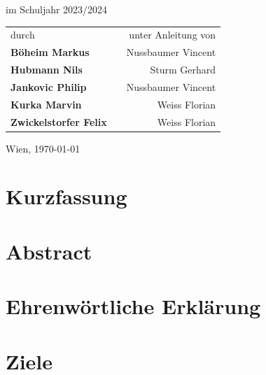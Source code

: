 \documentclass[
    headings=optiontotocandhead,%
    twoside,
    numbers=noenddot,%
    toc=flat, %
    12pt, %
    titlepage, %
    parskip=full, %
    listof=totoc, %
    listof=flat, %
    numbers=noenddot, %
    bibliography=totoc, %
    a4paper,DIV=14,
    BCOR=15mm,
]{scrbook}
\begin{document}
\begin{titlepage}
\begin{center}
 \vfill
 im Schuljahr 2023/2024\\

\vspace{1cm}

{
\renewcommand{\arraystretch}{1.8}
\begin{tabular}{l c r}
durch  & \hfill & unter Anleitung von \\
\textbf{\large{}Böheim Markus} && Nussbaumer Vincent \\
\textbf{\large{}Hubmann Nils} && Sturm Gerhard \\
\textbf{\large{}Jankovic Philip} && Nussbaumer Vincent \\
\textbf{\large{}Kurka Marvin} && Weiss Florian \\
\textbf{\large{}Zwickelstorfer Felix} && Weiss Florian \\
\end{tabular}
}

\vfill

Wien, \today
\par\end{center}

\end{titlepage}%
\chapter*{Kurzfassung}


\chapter*{Abstract}


\chapter*{Ehrenwörtliche Erklärung}


\cleardoublepage{}
\tableofcontents{}
\cleardoublepage{}
\listoftables
{}
\cleardoublepage{}
\listoffigures


\cleardoublepage{}
\mainmatter

\chapter{Ziele}
\end{document}

